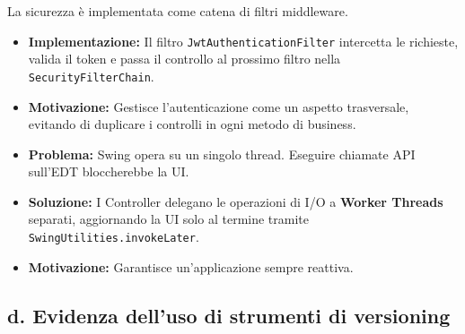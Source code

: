 \documentclass[a4paper,12pt]{article}
\begin{document}
\newpage

\begin{tcolorbox}[
    enhanced,
    colback=BoxLight,
    colframe=UninaBlue,
    boxrule=0.8pt,
    arc=3pt,
    sharp corners,
    title=7. Chain of Responsibility (Security Layer),
    fonttitle=\bfseries,
    coltitle=white,
    breakable
]
La sicurezza è implementata come catena di filtri middleware.
\begin{itemize}
    \item \textbf{Implementazione:} Il filtro \texttt{JwtAuthenticationFilter} intercetta le richieste, valida il token e passa il controllo al prossimo filtro nella \texttt{SecurityFilterChain}.
    \item \textbf{Motivazione:} Gestisce l'autenticazione come un aspetto trasversale, evitando di duplicare i controlli in ogni metodo di business.
\end{itemize}
\end{tcolorbox}

\vspace{0.5cm}
\begin{tcolorbox}[
    enhanced,
    colback=BoxLight,
    colframe=UninaBlue,
    boxrule=0.8pt,
    arc=3pt,
    sharp corners,
    title=8. Concorrenza nel Frontend (Worker Thread),
    fonttitle=\bfseries,
    coltitle=white,
    breakable
]
\begin{itemize}
    \item \textbf{Problema:} Swing opera su un singolo thread. Eseguire chiamate API sull'EDT bloccherebbe la UI.
    \item \textbf{Soluzione:} I Controller delegano le operazioni di I/O a \textbf{Worker Threads} separati, aggiornando la UI solo al termine tramite \texttt{SwingUtilities.invokeLater}.
    \item \textbf{Motivazione:} Garantisce un'applicazione sempre reattiva.
\end{itemize}
\end{tcolorbox}

\newpage
\subsection*{d. Evidenza dell'uso di strumenti di versioning}
{}
\end{document}
